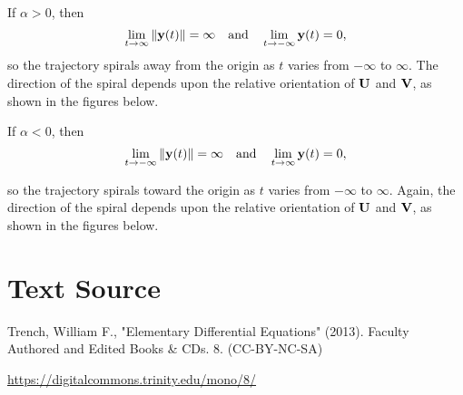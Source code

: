 \documentclass{ximera}
\begin{document}
If $\alpha>0$, then
$$
\lim_{t\rightarrow\infty}\norm{{\bf y}(t)}=\infty\quad\mbox{and}\quad
\lim_{t\rightarrow-\infty}{\bf y}(t)=0,
$$
so the trajectory spirals away from the origin as $t$ varies from
$-\infty$ to $\infty$. The direction of the spiral depends upon the
relative orientation of ${\bf U}$ and ${\bf V}$, as shown in
the figures below.

\begin{center}
\end{center}

\begin{center}
\end{center}




If $\alpha<0$,  then
$$
\lim_{t\rightarrow-\infty}\norm{{\bf y}(t)}=\infty\quad\mbox{and}\quad
\lim_{t\rightarrow\infty}{\bf y}(t)=0,
$$

so the trajectory spirals toward the origin as $t$ varies from
$-\infty$ to $\infty$. Again, the direction of the spiral depends upon
the relative orientation of ${\bf U}$ and ${\bf V}$, as shown in the figures below.

\begin{center}
\end{center}

\begin{center}
\end{center}




\section*{Text Source}
Trench, William F., "Elementary Differential Equations" (2013). Faculty Authored and Edited Books \& CDs. 8. (CC-BY-NC-SA)

\href{https://digitalcommons.trinity.edu/mono/8/}{https://digitalcommons.trinity.edu/mono/8/}
\end{document}
